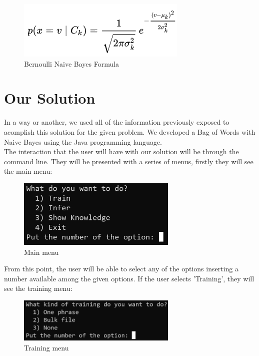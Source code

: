 \documentclass[sigconf,12pt,review=false,natbib=false]{acmart}
\begin{document}
\begin{figure}[h!]
    \centering
    \includegraphics[]{gaussian}
    \caption{Bernoulli Naive Bayes Formula}
    \label{fig:bnbf}
\end{figure}

\section{Our Solution}

In a way or another, we used all of the information previously exposed to acomplish this solution for the given problem.
We developed a Bag of Words with Naive Bayes using the Java programming language. \\

The interaction that the user will have with our solution will be through the command line. They will be presented
with a series of menus, firstly they will see the main menu: \\

\begin{figure}[h!]
    \centering
    \includegraphics[width=3in]{main_menu}
    \caption{Main menu}
    \label{fig:main_menu}
\end{figure}

From this point, the user will be able to select any of the options inserting a number available among the given
options. If the user selects 'Training', they will see the training menu: \\

\begin{figure}[h!]
    \centering
    \includegraphics[width=3in]{training_menu}
    \caption{Training menu}
    \label{fig:training_menu}
\end{figure}
\end{document}
